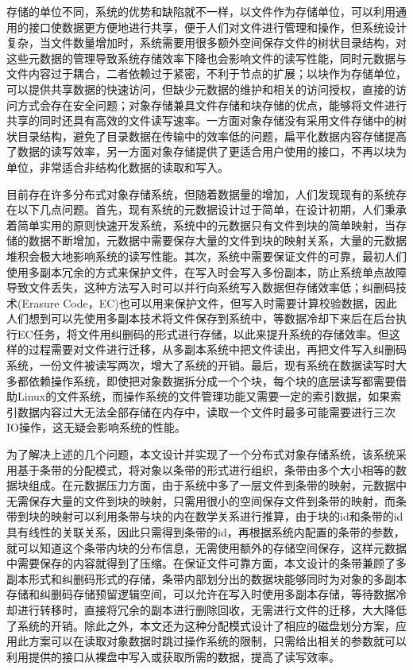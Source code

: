 存储的单位不同，系统的优势和缺陷就不一样，以文件作为存储单位，可以利用通用的接口使数据更方便地进行共享，便于人们对文件进行管理和操作，但系统设计复杂\cite{7}，当文件数量增加时，系统需要用很多额外空间保存文件的树状目录结构，对这些元数据的管理导致系统存储效率下降也会影响文件的读写性能，同时元数据与文件内容过于耦合，二者依赖过于紧密，不利于节点的扩展；以块作为存储单位，可以提供共享数据的快速访问，但缺少元数据的维护和相关的访问授权，直接的访问方式会存在安全问题\cite{8}；对象存储兼具文件存储和块存储的优点，能够将文件进行共享的同时还具有高效的文件读写速率\cite{9}。一方面对象存储没有采用文件存储中的树状目录结构，避免了目录数据在传输中的效率低的问题，扁平化数据内容存储提高了数据的读写效率，另一方面对象存储提供了更适合用户使用的接口，不再以块为单位，非常适合非结构化数据的读取和写入。

目前存在许多分布式对象存储系统，但随着数据量的增加，人们发现现有的系统存在以下几点问题。首先，现有系统的元数据设计过于简单，在设计初期，人们秉承着简单实用的原则快速开发系统，系统中的元数据只有文件到块的简单映射，当存储的数据不断增加，元数据中需要保存大量的文件到块的映射关系，大量的元数据堆积会极大地影响系统的读写性能。其次，系统中需要保证文件的可靠，最初人们使用多副本冗余的方式来保护文件，在写入时会写入多份副本，防止系统单点故障导致文件丢失，这种方法写入时可以并行向系统写入数据但存储效率低；纠删码技术(Erasure Code，EC)也可以用来保护文件，但写入时需要计算校验数据，因此人们想到可以先使用多副本技术将文件保存到系统中，等数据冷却下来后在后台执行EC任务，将文件用纠删码的形式进行存储，以此来提升系统的存储效率。但这样的过程需要对文件进行迁移，从多副本系统中把文件读出，再把文件写入纠删码系统，一份文件被读写两次，增大了系统的开销。最后，现有系统在数据读写时大多都依赖操作系统，即使把对象数据拆分成一个个块，每个块的底层读写都需要借助Linux的文件系统，而操作系统的文件管理功能又需要一定的索引数据，如果索引数据内容过大无法全部存储在内存中，读取一个文件时最多可能需要进行三次IO操作，这无疑会影响系统的性能。

为了解决上述的几个问题，本文设计并实现了一个分布式对象存储系统，该系统采用基于条带的分配模式，将对象以条带的形式进行组织，条带由多个大小相等的数据块组成。在元数据压力方面，由于系统中多了一层文件到条带的映射，元数据中无需保存大量的文件到块的映射，只需用很小的空间保存文件到条带的映射，而条带到块的映射可以利用条带与块的内在数学关系进行推算，由于块的id和条带的id具有线性的关联关系，因此只需得到条带的id，再根据系统内配置的条带的参数，就可以知道这个条带内块的分布信息，无需使用额外的存储空间保存，这样元数据中需要保存的内容就得到了压缩。在保证文件可靠方面，本文设计的条带兼顾了多副本形式和纠删码形式的存储，条带内部划分出的数据块能够同时为对象的多副本存储和纠删码存储预留逻辑空间，可以允许在写入时使用多副本存储，等待数据冷却进行转移时，直接将冗余的副本进行删除回收，无需进行文件的迁移，大大降低了系统的开销。除此之外，本文还为这种分配模式设计了相应的磁盘划分方案，应用此方案可以在读取对象数据时跳过操作系统的限制，只需给出相关的参数就可以利用提供的接口从裸盘中写入或获取所需的数据，提高了读写效率。


